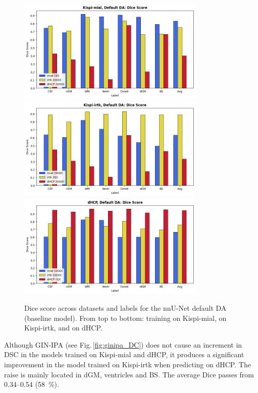 \begin{figure}[htbp]
  \centering
  \includegraphics[width=0.8\textwidth]{figures/mial_default_DC.png} \\
  \vspace{10pt}
  \includegraphics[width=0.8\textwidth]{figures/irtk_default_DC.png} \\
  \vspace{10pt}
  \includegraphics[width=0.8\textwidth]{figures/dHCP_default_DC.png}
  \caption{Dice score across datasets and labels for the nnU-Net default DA (baseline model). From top to bottom: training on Kispi-mial, on Kispi-irtk, and on dHCP.}
  \label{fig:default_DC}
\end{figure}

Although GIN-IPA (see Fig.\,\ref{fig:ginipa_DC}) does not cause an increment in DSC in the models trained on Kispi-mial and dHCP, it produces a significant improvement in the model trained on Kispi-irtk when predicting on dHCP. The raise is mainly located in dGM, ventricles and BS. The average Dice passes from \numrange[range-open-phrase=from\ ]{0.34}{0.54} (\qty{+58}{\percent}).

